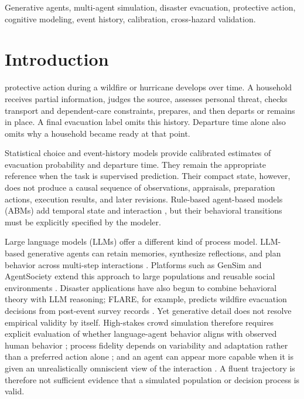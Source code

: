 \documentclass[journal]{IEEEtran}
\begin{document}
\begin{IEEEkeywords}
Generative agents, multi-agent simulation, disaster evacuation, protective
action, cognitive modeling, event history, calibration, cross-hazard
validation.
\end{IEEEkeywords}

\section{Introduction}
 protective action during a wildfire or hurricane
develops over time. A household receives partial information, judges the
source, assesses personal threat, checks transport and dependent-care
constraints, prepares, and then departs or remains in place. A final
evacuation label omits this history. Departure time alone also omits why a
household became ready at that point.

Statistical choice and event-history models provide calibrated estimates of
evacuation probability and departure time. They remain the appropriate
reference when the task is supervised prediction. Their compact state,
however, does not produce a causal sequence of observations, appraisals,
preparation actions, execution results, and later revisions. Rule-based
agent-based models (ABMs) add temporal state and interaction
\cite{bonabeau2002agent,macal2010tutorial}, but their behavioral transitions
must be explicitly specified by the modeler.

Large language models (LLMs) offer a different kind of process model.
LLM-based generative agents can retain memories, synthesize reflections, and
plan behavior across multi-step interactions \cite{park2023generative}.
Platforms such as GenSim and AgentSociety extend this approach to large
populations and reusable social environments
\cite{tang2024gensim,piao2025agentsociety}. Disaster applications have also
begun to combine behavioral theory with LLM reasoning; FLARE, for example,
predicts wildfire evacuation decisions from post-event survey records
\cite{chen2025flare}. Yet generative detail does not resolve empirical
validity by itself. High-stakes crowd simulation therefore requires explicit
evaluation of whether language-agent behavior aligns with observed human
behavior \cite{wang2025alignment}; process fidelity depends on variability and
adaptation rather than a preferred action alone
\cite{feng2025fidelity}; and an agent can appear more capable when it is given
an unrealistically omniscient view of the interaction
\cite{zhou2024fantasy}. A fluent trajectory is therefore not sufficient
evidence that a simulated population or decision process is valid.
\end{document}
